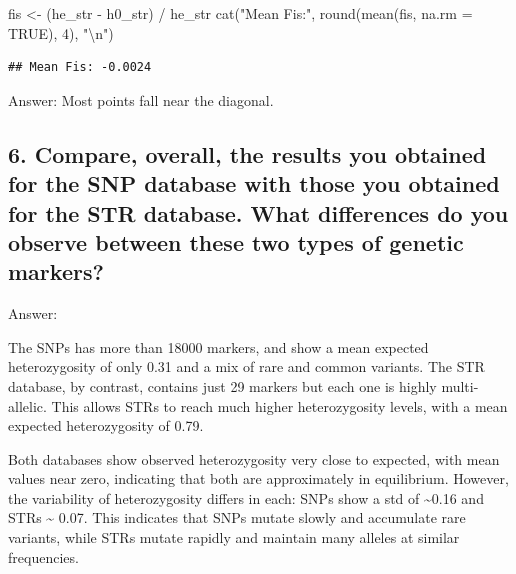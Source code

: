 \documentclass[
]{article}
\newenvironment{Shaded}{\begin{snugshade}}{\end{snugshade}}
\newcommand{\AttributeTok}[1]{\textcolor[rgb]{0.77,0.63,0.00}{#1}}
\newcommand{\ConstantTok}[1]{\textcolor[rgb]{0.00,0.00,0.00}{#1}}
\newcommand{\DecValTok}[1]{\textcolor[rgb]{0.00,0.00,0.81}{#1}}
\newcommand{\FunctionTok}[1]{\textcolor[rgb]{0.00,0.00,0.00}{#1}}
\newcommand{\NormalTok}[1]{#1}
\newcommand{\OtherTok}[1]{\textcolor[rgb]{0.56,0.35,0.01}{#1}}
\newcommand{\SpecialCharTok}[1]{\textcolor[rgb]{0.00,0.00,0.00}{#1}}
\newcommand{\StringTok}[1]{\textcolor[rgb]{0.31,0.60,0.02}{#1}}
\begin{document}
\begin{Shaded}
\begin{Highlighting}[]
\NormalTok{fis }\OtherTok{\textless{}{-}}\NormalTok{ (he\_str }\SpecialCharTok{{-}}\NormalTok{ h0\_str) }\SpecialCharTok{/}\NormalTok{ he\_str}
\FunctionTok{cat}\NormalTok{(}\StringTok{"Mean Fis:"}\NormalTok{, }\FunctionTok{round}\NormalTok{(}\FunctionTok{mean}\NormalTok{(fis, }\AttributeTok{na.rm =} \ConstantTok{TRUE}\NormalTok{), }\DecValTok{4}\NormalTok{), }\StringTok{"}\SpecialCharTok{\textbackslash{}n}\StringTok{"}\NormalTok{)}
\end{Highlighting}
\end{Shaded}

\begin{verbatim}
## Mean Fis: -0.0024
\end{verbatim}

Answer: Most points fall near the diagonal.

\hypertarget{compare-overall-the-results-you-obtained-for-the-snp-database-with-those-you-obtained-for-the-str-database.-what-differences-do-you-observe-between-these-two-types-of-genetic-markers}{%
\subsection{6. Compare, overall, the results you obtained for the SNP
database with those you obtained for the STR database. What differences
do you observe between these two types of genetic
markers?}\label{compare-overall-the-results-you-obtained-for-the-snp-database-with-those-you-obtained-for-the-str-database.-what-differences-do-you-observe-between-these-two-types-of-genetic-markers}}

Answer:

The SNPs has more than 18000 markers, and show a mean expected
heterozygosity of only 0.31 and a mix of rare and common variants. The
STR database, by contrast, contains just 29 markers but each one is
highly multi-allelic. This allows STRs to reach much higher
heterozygosity levels, with a mean expected heterozygosity of 0.79.

Both databases show observed heterozygosity very close to expected, with
mean values near zero, indicating that both are approximately in
equilibrium. However, the variability of heterozygosity differs in each:
SNPs show a std of \textasciitilde0.16 and STRs \textasciitilde{} 0.07.
This indicates that SNPs mutate slowly and accumulate rare variants,
while STRs mutate rapidly and maintain many alleles at similar
frequencies.
\end{document}
